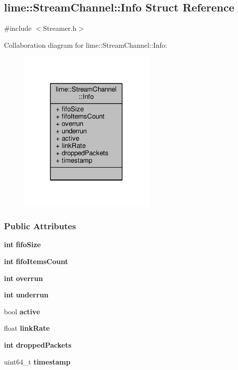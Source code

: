 \subsection{lime\+:\+:Stream\+Channel\+:\+:Info Struct Reference}
\label{structlime_1_1StreamChannel_1_1Info}


{\ttfamily \#include $<$Streamer.\+h$>$}



Collaboration diagram for lime\+:\+:Stream\+Channel\+:\+:Info\+:
\nopagebreak
\begin{figure}[H]
\begin{center}
\leavevmode
\includegraphics[width=188pt]{db/dab/structlime_1_1StreamChannel_1_1Info__coll__graph}
\end{center}
\end{figure}
\subsubsection*{Public Attributes}
\begin{DoxyCompactItemize}
\item 
{\bf int} {\bf fifo\+Size}
\item 
{\bf int} {\bf fifo\+Items\+Count}
\item 
{\bf int} {\bf overrun}
\item 
{\bf int} {\bf underrun}
\item 
bool {\bf active}
\item 
float {\bf link\+Rate}
\item 
{\bf int} {\bf dropped\+Packets}
\item 
uint64\+\_\+t {\bf timestamp}
\end{DoxyCompactItemize}


